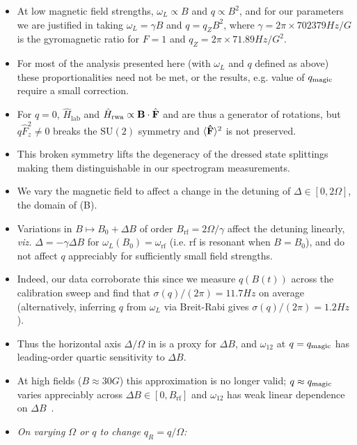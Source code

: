 \documentclass[aps,prl,reprint,superscriptaddress,floatfix]{revtex4-1}
\begin{document}
\begin{itemize}
    \item At low magnetic field strengths, $\omega_L \propto B$ and $q \propto B^2$, and for our parameters we are justified in taking $\omega_L = \gamma B$ and $q = q_Z B^2$, where $\gamma = 2\pi \times 702379\unit{Hz/G}$ is the gyromagnetic ratio for \Rb $F=1$ and $q_Z = 2\pi \times 71.89\unit{Hz/G^2}$.
    \item For most of the analysis presented here (with $\omega_L$ and $q$ defined as above) these proportionalities need not be met, or the results, e.g. value of $q_{\text{magic}}$ require a small correction. 
    \item For $q=0$, $\hat{H}_{\text{lab}}$ and $\hat{H}_{\text{rwa}} \propto \mathbf{B} \cdot \hat{\mathbf{F}}$ and are thus a generator of rotations, but $q \hat{F}_z^2 \neq 0$ breaks the $\text{SU}(2)$ symmetry and $\langle \mathbf{\hat{F}} \rangle^2$ is not preserved.
    \item This broken symmetry lifts the degeneracy of the dressed state splittings making them distinguishable in our spectrogram measurements.
    \item We vary the magnetic field to affect a change in the detuning of $\Delta \in [0, 2\Omega]$, the domain of (B).
    \item Variations in $B \mapsto B_0 + \Delta B$ of order $B_{\text{rf}} = 2\Omega/\gamma$ affect the detuning linearly, \emph{viz.} $\Delta = - \gamma \Delta B$ for $\omega_L(B_0) = \omega_{\text{rf}}$ (i.e. rf is resonant when $B=B_0$), and do not affect $q$ appreciably for sufficiently small field strengths.
    \item Indeed, our data corroborate this since we measure $q(B(t))$ across the calibration sweep and find that $\sigma(q)/(2\pi) = 11.7\unit{Hz}$ on average (alternatively, inferring $q$ from $\omega_L$ via Breit-Rabi gives $\sigma(q)/(2\pi) = 1.2\unit{Hz}$).
    \item Thus the horizontal axis $\Delta/\Omega$ in  is a proxy for $\Delta B$, and $\omega_{12}$ at $q=q_{\text{magic}}$ has leading-order quartic sensitivity to $\Delta B$.
    \item At high fields ($B\approx 30\unit{G}$) this approximation is no longer valid; $q \approx q_{\text{magic}}$ varies appreciably across $\Delta B \in [0, B_{\text{rf}}]$ and $\omega_{12}$ has weak linear dependence on $\Delta B$~\cite{lundblad_synthetic_2017}.
    \item \emph{On varying $\Omega$ or $q$ to change $q_R=q/\Omega$:}

\end{itemize}
\end{document}
